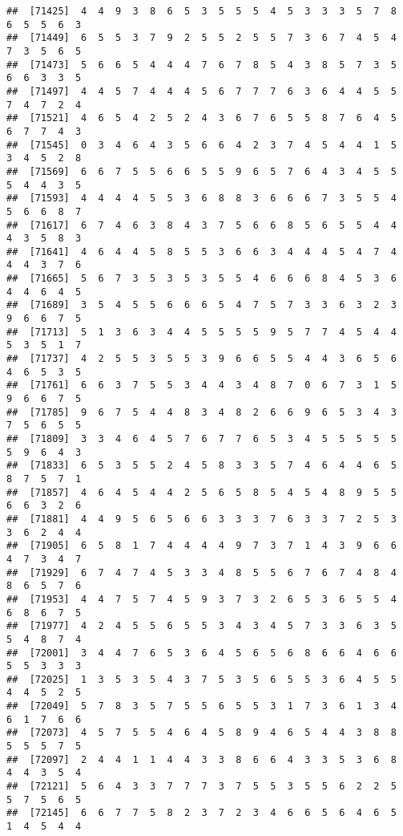 \documentclass[
]{book}
\begin{document}
\begin{verbatim}
##  [71425]  4  4  9  3  8  6  5  3  5  5  5  4  5  3  3  3  5  7  8  6  5  5  6  3
##  [71449]  6  5  5  3  7  9  2  5  5  2  5  5  7  3  6  7  4  5  4  7  3  5  6  5
##  [71473]  5  6  6  5  4  4  4  7  6  7  8  5  4  3  8  5  7  3  5  6  6  3  3  5
##  [71497]  4  4  5  7  4  4  4  5  6  7  7  7  6  3  6  4  4  5  5  7  4  7  2  4
##  [71521]  4  6  5  4  2  5  2  4  3  6  7  6  5  5  8  7  6  4  5  6  7  7  4  3
##  [71545]  0  3  4  6  4  3  5  6  6  4  2  3  7  4  5  4  4  1  5  3  4  5  2  8
##  [71569]  6  6  7  5  5  6  6  5  5  9  6  5  7  6  4  3  4  5  5  5  4  4  3  5
##  [71593]  4  4  4  4  5  5  3  6  8  8  3  6  6  6  7  3  5  5  4  5  6  6  8  7
##  [71617]  6  7  4  6  3  8  4  3  7  5  6  6  8  5  6  5  5  4  4  4  3  5  8  3
##  [71641]  4  6  4  4  5  8  5  5  3  6  6  3  4  4  4  5  4  7  4  4  4  3  7  6
##  [71665]  5  6  7  3  5  3  5  3  5  5  4  6  6  6  8  4  5  3  6  4  4  6  4  5
##  [71689]  3  5  4  5  5  6  6  6  5  4  7  5  7  3  3  6  3  2  3  9  6  6  7  5
##  [71713]  5  1  3  6  3  4  4  5  5  5  5  9  5  7  7  4  5  4  4  5  3  5  1  7
##  [71737]  4  2  5  5  3  5  5  3  9  6  6  5  5  4  4  3  6  5  6  4  6  5  3  5
##  [71761]  6  6  3  7  5  5  3  4  4  3  4  8  7  0  6  7  3  1  5  9  6  6  7  5
##  [71785]  9  6  7  5  4  4  8  3  4  8  2  6  6  9  6  5  3  4  3  7  5  6  5  5
##  [71809]  3  3  4  6  4  5  7  6  7  7  6  5  3  4  5  5  5  5  5  5  9  6  4  3
##  [71833]  6  5  3  5  5  2  4  5  8  3  3  5  7  4  6  4  4  6  5  8  7  5  7  1
##  [71857]  4  6  4  5  4  4  2  5  6  5  8  5  4  5  4  8  9  5  5  6  6  3  2  6
##  [71881]  4  4  9  5  6  5  6  6  3  3  3  7  6  3  3  7  2  5  3  3  6  2  4  4
##  [71905]  6  5  8  1  7  4  4  4  4  9  7  3  7  1  4  3  9  6  6  4  7  3  4  7
##  [71929]  6  7  4  7  4  5  3  3  4  8  5  5  6  7  6  7  4  8  4  8  6  5  7  6
##  [71953]  4  4  7  5  7  4  5  9  3  7  3  2  6  5  3  6  5  5  4  6  8  6  7  5
##  [71977]  4  2  4  5  5  6  5  5  3  4  3  4  5  7  3  3  6  3  5  5  4  8  7  4
##  [72001]  3  4  4  7  6  5  3  6  4  5  6  5  6  8  6  6  4  6  6  5  5  3  3  3
##  [72025]  1  3  5  3  5  4  3  7  5  3  5  6  5  5  3  6  4  5  5  4  4  5  2  5
##  [72049]  5  7  8  3  5  7  5  5  6  5  5  3  1  7  3  6  1  3  4  6  1  7  6  6
##  [72073]  4  5  7  5  5  4  6  4  5  8  9  4  6  5  4  4  3  8  8  5  5  5  7  5
##  [72097]  2  4  4  1  1  4  4  3  3  8  6  6  4  3  3  5  3  6  8  4  4  3  5  4
##  [72121]  5  6  4  3  3  7  7  7  3  7  5  5  3  5  5  6  2  2  5  5  7  5  6  5
##  [72145]  6  6  7  7  5  8  2  3  7  2  3  4  6  6  5  6  4  6  5  1  4  5  4  4

\end{verbatim}
\end{document}
